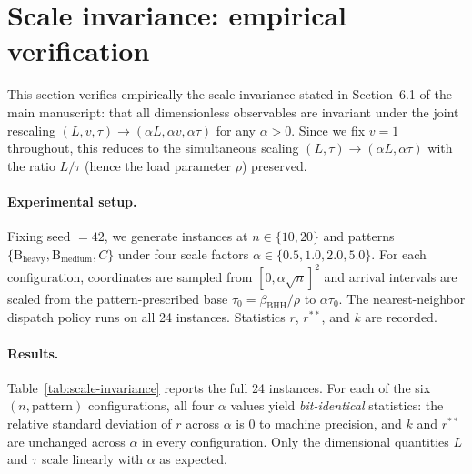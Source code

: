 \documentclass[11pt]{article}
\begin{document}
\section{Scale invariance: empirical verification}
\label{app:scale-invariance}

This section verifies empirically the scale invariance stated in Section~6.1 of the main manuscript: that all dimensionless observables are invariant under the joint rescaling $(L, v, \tau) \to (\alpha L, \alpha v, \alpha \tau)$ for any $\alpha > 0$. Since we fix $v = 1$ throughout, this reduces to the simultaneous scaling $(L, \tau) \to (\alpha L, \alpha \tau)$ with the ratio $L/\tau$ (hence the load parameter $\rho$) preserved.

\paragraph{Experimental setup.} Fixing seed $=42$, we generate instances at $n\in\{10,20\}$ and patterns $\{\text{B}_{\text{heavy}},\text{B}_{\text{medium}}, C\}$ under four scale factors $\alpha\in\{0.5,1.0,2.0,5.0\}$. For each configuration, coordinates are sampled from $[0,\alpha\sqrt{n}]^2$ and arrival intervals are scaled from the pattern-prescribed base $\tau_0=\beta_{\mathrm{BHH}}/\rho$ to $\alpha\tau_0$. The nearest-neighbor dispatch policy runs on all 24 instances. Statistics $r$, $r^{\ast\ast}$, and $k$ are recorded.

\paragraph{Results.} Table~\ref{tab:scale-invariance} reports the full 24 instances. For each of the six $(n,\text{pattern})$ configurations, all four $\alpha$ values yield \emph{bit-identical} statistics: the relative standard deviation of $r$ across $\alpha$ is $0$ to machine precision, and $k$ and $r^{\ast\ast}$ are unchanged across $\alpha$ in every configuration. Only the dimensional quantities $L$ and $\tau$ scale linearly with $\alpha$ as expected.
\end{document}
